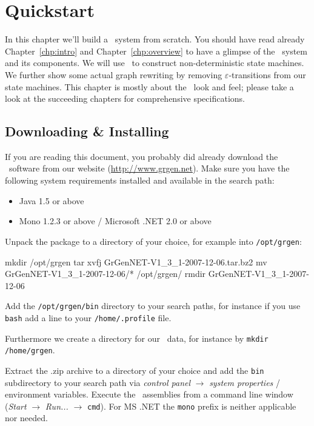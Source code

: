 \chapter{Quickstart}

In this chapter we'll build a \GrG\ system from scratch.
You should have read already Chapter~\ref{chp:intro} and Chapter~\ref{chp:overview} to have a glimpse of the \GrG\ system and its components.
We will use \GrG\ to construct non-deterministic state machines.
We further show some actual graph rewriting by removing $\varepsilon$-transitions from our state machines.
This chapter is mostly about the \GrG\ look and feel; please take a look at the succeeding chapters for comprehensive specifications.


\section{Downloading \& Installing}
If you are reading this document, you probably did already download the \GrG\ software from our website (\url{http://www.grgen.net}).
Make sure you have the following system requirements installed and available in the search path:
\begin{itemize}
	\item Java 1.5 or above
	\item Mono 1.2.3 or above / Microsoft .NET 2.0 or above
\end{itemize}

Unpack the package to a directory of your choice, for example into \texttt{/opt/grgen}:
\begin{bash}
mkdir /opt/grgen
tar xvfj GrGenNET-V1_3_1-2007-12-06.tar.bz2
mv GrGenNET-V1_3_1-2007-12-06/* /opt/grgen/
rmdir GrGenNET-V1_3_1-2007-12-06
\end{bash}
Add the \texttt{/opt/grgen/bin} directory to your search paths, for instance if you use \texttt{bash} add a line to your \texttt{/home/.profile} file.
Furthermore we create a directory for our \GrG\ data, for instance by \texttt{mkdir /home/grgen}.

\vspace{2mm}
Extract the .zip archive to a directory of your choice and add the \texttt{bin} subdirectory to your search path via \emph{control panel} $\rightarrow$ \emph{system properties} / environment variables.
Execute the \GrG\ assemblies from a command line window (\emph{Start} $\rightarrow$ \emph{Run...} $\rightarrow$ \texttt{cmd}).
For MS .NET the \texttt{mono} prefix is neither applicable nor needed.

